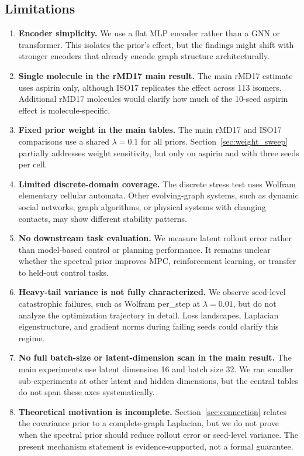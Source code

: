 \subsection{Limitations}\label{sec:limitations}

\begin{enumerate}
\item \textbf{Encoder simplicity.} We use a flat MLP encoder rather than a GNN or transformer. This isolates the prior's effect, but the findings might shift with stronger encoders that already encode graph structure architecturally.
\item \textbf{Single molecule in the rMD17 main result.} The main rMD17 estimate uses aspirin only, although ISO17 replicates the effect across 113 isomers. Additional rMD17 molecules would clarify how much of the 10-seed aspirin effect is molecule-specific.
\item \textbf{Fixed prior weight in the main tables.} The main rMD17 and ISO17 comparisons use a shared \(\lambda=0.1\) for all priors. Section~\ref{sec:weight_sweep} partially addresses weight sensitivity, but only on aspirin and with three seeds per cell.
\item \textbf{Limited discrete-domain coverage.} The discrete stress test uses Wolfram elementary cellular automata. Other evolving-graph systems, such as dynamic social networks, graph algorithms, or physical systems with changing contacts, may show different stability patterns.
\item \textbf{No downstream task evaluation.} We measure latent rollout error rather than model-based control or planning performance. It remains unclear whether the spectral prior improves MPC, reinforcement learning, or transfer to held-out control tasks.
\item \textbf{Heavy-tail variance is not fully characterized.} We observe seed-level catastrophic failures, such as Wolfram per\_step at \(\lambda=0.01\), but do not analyze the optimization trajectory in detail. Loss landscapes, Laplacian eigenstructure, and gradient norms during failing seeds could clarify this regime.
\item \textbf{No full batch-size or latent-dimension scan in the main result.} The main experiments use latent dimension 16 and batch size 32. We ran smaller sub-experiments at other latent and hidden dimensions, but the central tables do not span these axes systematically.
\item \textbf{Theoretical motivation is incomplete.} Section~\ref{sec:connection} relates the covariance prior to a complete-graph Laplacian, but we do not prove when the spectral prior should reduce rollout error or seed-level variance. The present mechanism statement is evidence-supported, not a formal guarantee.
\end{enumerate}

